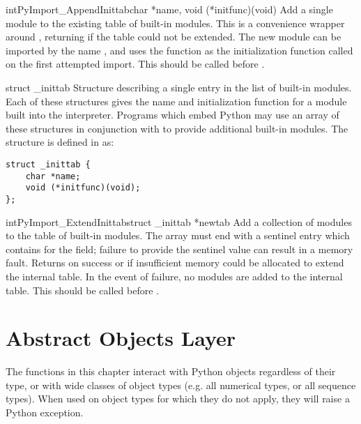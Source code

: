 \documentclass{manual}
\begin{document}
\begin{cfuncdesc}{int}{PyImport_AppendInittab}{char *name,
                                               void (*initfunc)(void)}
Add a single module to the existing table of built-in modules.  This
is a convenience wrapper around ,
returning  if the table could not be extended.  The new
module can be imported by the name , and uses the function
 as the initialization function called on the first
attempted import.  This should be called before
.
\end{cfuncdesc}

\begin{ctypedesc}[_inittab]{struct _inittab}
Structure describing a single entry in the list of built-in modules.
Each of these structures gives the name and initialization function
for a module built into the interpreter.  Programs which embed Python
may use an array of these structures in conjunction with
 to provide additional built-in
modules.  The structure is defined in  as:

\begin{verbatim}
struct _inittab {
    char *name;
    void (*initfunc)(void);
};
\end{verbatim}
\end{ctypedesc}

\begin{cfuncdesc}{int}{PyImport_ExtendInittab}{struct _inittab *newtab}
Add a collection of modules to the table of built-in modules.  The
 array must end with a sentinel entry which contains
\NULL{} for the  field; failure to provide the sentinel
value can result in a memory fault.  Returns  on success or
 if insufficient memory could be allocated to extend the
internal table.  In the event of failure, no modules are added to the
internal table.  This should be called before
.
\end{cfuncdesc}


\chapter{Abstract Objects Layer \label{abstract}}

The functions in this chapter interact with Python objects regardless
of their type, or with wide classes of object types (e.g. all
numerical types, or all sequence types).  When used on object types
for which they do not apply, they will raise a Python exception.
\end{document}

